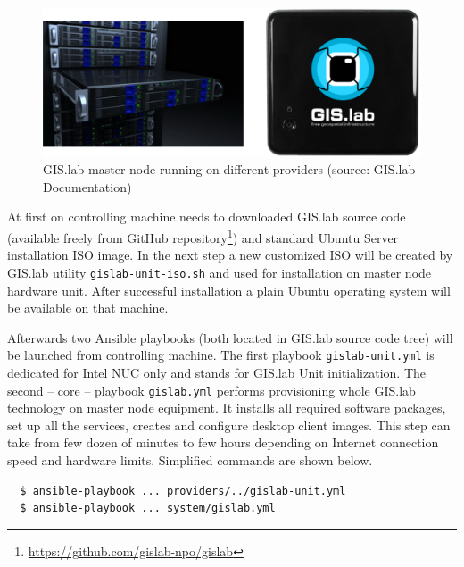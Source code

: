 \documentclass{isprs}
\begin{document}
\begin{figure}[ht!]
\begin{center}
  \includegraphics[width=0.9\columnwidth]{figures/gislab-unit.png}
  \caption{GIS.lab master node running on different providers (source:
    GIS.lab Documentation)}
\label{fig:gislab_infrastructure}
\end{center}
\end{figure}

At first on controlling machine needs to downloaded GIS.lab source
code (available freely from GitHub
repository\footnote{\url{https://github.com/gislab-npo/gislab}}) and
standard Ubuntu Server installation ISO image. In the next step a new
customized ISO will be created by GIS.lab utility
\texttt{gislab-unit-iso.sh} and used for installation on master node
hardware unit. After successful installation a plain Ubuntu operating
system will be available on that machine.

Afterwards two Ansible playbooks (both located in GIS.lab source code
tree) will be launched from controlling machine. The first playbook
\texttt{gislab-unit.yml} is dedicated for Intel NUC only and stands
for GIS.lab Unit initialization. The second -- core -- playbook
\texttt{gislab.yml} performs provisioning whole GIS.lab technology on
master node equipment. It installs all required software packages, set
up all the services, creates and configure desktop client images. This
step can take from few dozen of minutes to few hours depending on Internet
connection speed and hardware limits. Simplified commands are shown
below.

\begin{lstlisting}
  $ ansible-playbook ... providers/../gislab-unit.yml
  $ ansible-playbook ... system/gislab.yml
\end{lstlisting}
\end{document}
